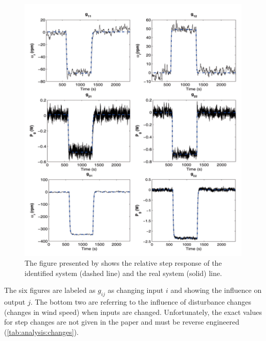 \begin{figure}[H]
    \center
    \includegraphics[scale=0.5]{fig/Fragoso_et_al_2017_fig6.png}
    \caption{The figure presented by \cite{Fragoso_et_al_2017} shows the relative step response of the identified system (dashed line) and the real system (solid) line.}
    \label{fig:analysis:fig_step_response}
\end{figure}

The six figures are labeled as $g_{ij}$ as changing input $i$ and showing the influence on output $j$.
The bottom two are referring to the influence of disturbance changes (changes in wind speed) when inputs are changed.
Unfortunately, the exact values for step changes are not given in the paper and must be reverse engineered (\autoref{tab:analysis:changes}).

